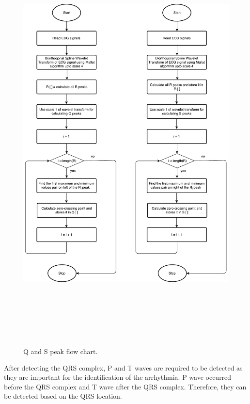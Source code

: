 \begin{figure}[htpb]
	\centering
	\includegraphics[width=25cm,height=22cm,keepaspectratio=true]{images/q-and-s.pdf}
	\caption{
		Q and S peak flow chart.
	}
	\label{fig:qs}
\end{figure}



After detecting the QRS complex, P and T waves are required to be detected as they are important for the identification of the arrhythmia. P wave occurred before the QRS complex and T wave after the QRS complex. Therefore, they can be detected based on the QRS location.

